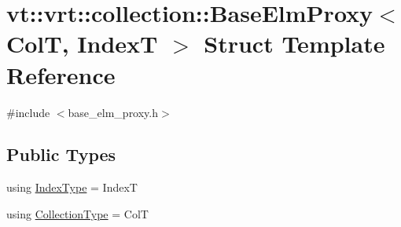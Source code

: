 \hypertarget{structvt_1_1vrt_1_1collection_1_1_base_elm_proxy}{}\section{vt\+:\+:vrt\+:\+:collection\+:\+:Base\+Elm\+Proxy$<$ ColT, IndexT $>$ Struct Template Reference}
\label{structvt_1_1vrt_1_1collection_1_1_base_elm_proxy}


{\ttfamily \#include $<$base\+\_\+elm\+\_\+proxy.\+h$>$}

\subsection*{Public Types}
\begin{DoxyCompactItemize}
\item 
using \hyperlink{structvt_1_1vrt_1_1collection_1_1_base_elm_proxy_a7b621d974ce749881261dce97b20c73f}{Index\+Type} = IndexT
\item 
using \hyperlink{structvt_1_1vrt_1_1collection_1_1_base_elm_proxy_adf717305f2496b7d50be60a903da8755}{Collection\+Type} = ColT
\end{DoxyCompactItemize}
